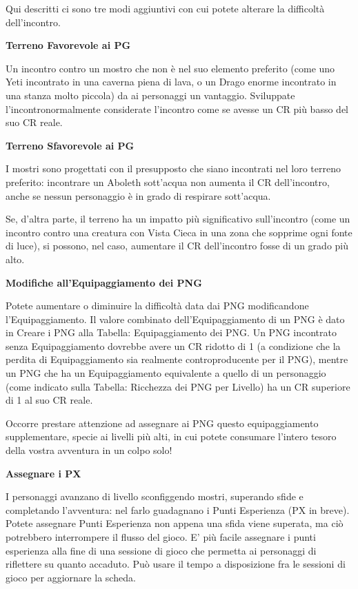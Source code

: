 \documentclass[a4paper,11pt,twoside,openany]{book}
\begin{document}
Qui descritti ci sono tre modi aggiuntivi con cui potete alterare la difficoltà dell'incontro.

\textbf{Terreno Favorevole ai PG}

Un incontro contro un mostro che non è nel suo elemento preferito (come uno Yeti incontrato in una caverna piena di lava, o un Drago enorme incontrato in una stanza molto piccola) da ai personaggi un vantaggio. Sviluppate l'incontronormalmente considerate l'incontro come se avesse un CR più basso del suo CR reale.

\textbf{Terreno Sfavorevole ai PG}

I mostri sono progettati con il presupposto che siano incontrati nel loro terreno preferito: incontrare un Aboleth sott’acqua non aumenta il CR dell'incontro, anche se nessun personaggio è in grado di respirare sott'acqua.

Se, d’altra parte, il terreno ha un impatto più significativo sull'incontro (come un incontro contro una creatura con Vista Cieca in una zona che sopprime ogni fonte di luce), si possono, nel caso, aumentare il CR dell'incontro fosse di un grado più alto.


\textbf{Modifiche all'Equipaggiamento dei PNG}

Potete aumentare o diminuire la difficoltà data dai PNG modificandone l'Equipaggiamento. Il valore combinato dell'Equipaggiamento di un PNG è dato in Creare i PNG alla Tabella: Equipaggiamento dei PNG. Un PNG incontrato senza Equipaggiamento dovrebbe avere un CR ridotto di 1 (a condizione che la perdita di Equipaggiamento sia realmente controproducente per il PNG), mentre un PNG che ha un Equipaggiamento equivalente a quello di un personaggio (come indicato sulla Tabella: Ricchezza dei PNG per Livello) ha un CR superiore di 1 al suo CR reale.

Occorre prestare attenzione ad assegnare ai PNG questo equipaggiamento supplementare, specie ai livelli più alti, in cui potete consumare l'intero tesoro della vostra avventura in un colpo solo!

\textbf{Assegnare i PX}

I personaggi avanzano di livello sconfiggendo mostri, superando sfide e completando l'avventura: nel farlo guadagnano i Punti Esperienza (PX in breve). Potete assegnare Punti Esperienza non appena una sfida viene superata, ma ciò potrebbero interrompere il flusso del gioco. E' più facile assegnare i punti esperienza alla fine di una sessione di gioco che permetta ai personaggi di riflettere su quanto accaduto. Può usare il tempo a disposizione fra le sessioni di gioco per aggiornare la scheda.
\end{document}
